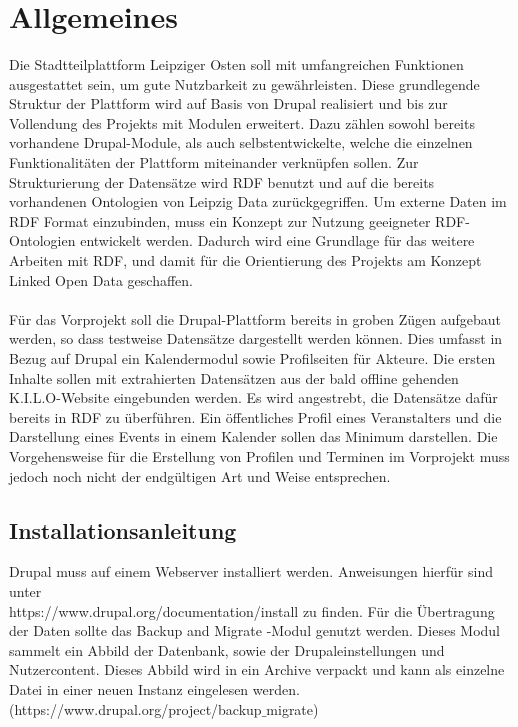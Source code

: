 \documentclass{swp}
\begin{document}
\\\\\\\\\\

\tableofcontents
\newpage
\section{Allgemeines}
Die Stadtteilplattform Leipziger Osten soll mit umfangreichen Funktionen ausgestattet sein, um gute Nutzbarkeit zu gew\"ahrleisten. Diese grundlegende Struktur der Plattform wird auf Basis von Drupal realisiert und bis zur Vollendung des Projekts mit Modulen erweitert. Dazu z\"ahlen sowohl bereits vorhandene Drupal-Module, als auch selbstentwickelte, welche die einzelnen Funktionalit\"aten der Plattform miteinander verkn\"upfen sollen. Zur Strukturierung der Datens\"atze wird RDF benutzt und auf die bereits vorhandenen Ontologien von Leipzig Data zur\"uckgegriffen. Um externe Daten im RDF Format einzubinden, muss ein Konzept zur Nutzung geeigneter RDF-Ontologien entwickelt werden. Dadurch wird eine Grundlage f\"ur das weitere Arbeiten mit RDF, und damit f\"ur die Orientierung des Projekts am Konzept Linked Open Data geschaffen.\\\\
F\"ur das Vorprojekt soll die Drupal-Plattform bereits in groben Z\"ugen aufgebaut werden, so dass testweise Datens\"atze dargestellt werden k\"onnen. Dies umfasst in Bezug auf Drupal ein Kalendermodul sowie Profilseiten f\"ur Akteure. Die ersten Inhalte sollen mit extrahierten Datens\"atzen aus der bald offline gehenden K.I.L.O-Website eingebunden werden. Es wird angestrebt, die Datens\"atze daf\"ur bereits in RDF zu \"uberf\"uhren. Ein \"offentliches Profil eines Veranstalters und die Darstellung eines Events in einem Kalender sollen das Minimum darstellen. Die Vorgehensweise f\"ur die Erstellung von Profilen und Terminen im Vorprojekt muss jedoch noch nicht der endg\"ultigen Art und Weise entsprechen.

\subsection{Installationsanleitung}
Drupal muss auf einem Webserver installiert werden. Anweisungen hierf\"ur sind unter \\https://www.drupal.org/documentation/install zu finden. F\"ur die \"Ubertragung der Daten sollte das \glqq Backup and Migrate\grqq{} -Modul genutzt werden. Dieses Modul sammelt ein Abbild der Datenbank, sowie der Drupaleinstellungen und Nutzercontent. Dieses Abbild wird in ein Archive verpackt und kann als einzelne Datei in einer neuen Instanz eingelesen werden. \\(https://www.drupal.org/project/backup$\_$migrate)
\end{document}

